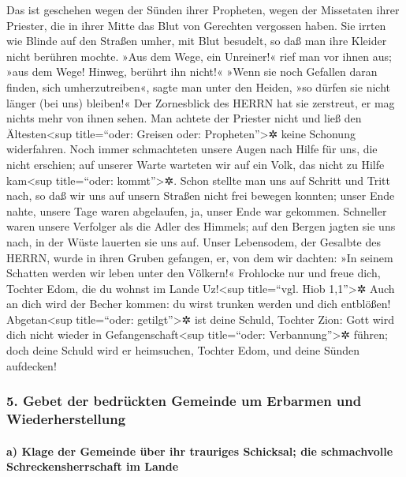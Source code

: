 Das ist geschehen wegen der Sünden ihrer Propheten, wegen
der Missetaten ihrer Priester, die in ihrer Mitte das Blut von Gerechten
vergossen haben. Sie irrten wie Blinde auf den Straßen
umher, mit Blut besudelt, so daß man ihre Kleider nicht berühren mochte.
»Aus dem Wege, ein Unreiner!« rief man vor ihnen aus;
»aus dem Wege! Hinweg, berührt ihn nicht!« »Wenn sie noch Gefallen daran
finden, sich umherzutreiben«, sagte man unter den Heiden, »so dürfen sie
nicht länger (bei uns) bleiben!« Der Zornesblick des
HERRN hat sie zerstreut, er mag nichts mehr von ihnen sehen. Man achtete
der Priester nicht und ließ den Ältesten\textless sup title=``oder:
Greisen oder: Propheten''\textgreater✲ keine Schonung widerfahren.
Noch immer schmachteten unsere Augen nach Hilfe für uns,
die nicht erschien; auf unserer Warte warteten wir auf ein Volk, das
nicht zu Hilfe kam\textless sup title=``oder: kommt''\textgreater✲.
Schon stellte man uns auf Schritt und Tritt nach, so daß
wir uns auf unsern Straßen nicht frei bewegen konnten; unser Ende nahte,
unsere Tage waren abgelaufen, ja, unser Ende war gekommen.
Schneller waren unsere Verfolger als die Adler des
Himmels; auf den Bergen jagten sie uns nach, in der Wüste lauerten sie
uns auf. Unser Lebensodem, der Gesalbte des HERRN, wurde
in ihren Gruben gefangen, er, von dem wir dachten: »In seinem Schatten
werden wir leben unter den Völkern!« Frohlocke nur und
freue dich, Tochter Edom, die du wohnst im Lande Uz!\textless sup
title=``vgl. Hiob 1,1''\textgreater✲ Auch an dich wird der Becher
kommen: du wirst trunken werden und dich entblößen!
Abgetan\textless sup title=``oder: getilgt''\textgreater✲
ist deine Schuld, Tochter Zion: Gott wird dich nicht wieder in
Gefangenschaft\textless sup title=``oder: Verbannung''\textgreater✲
führen; doch deine Schuld wird er heimsuchen, Tochter Edom, und deine
Sünden aufdecken!

\hypertarget{gebet-der-bedruxfcckten-gemeinde-um-erbarmen-und-wiederherstellung}{%
\subsubsection{5. Gebet der bedrückten Gemeinde um Erbarmen und
Wiederherstellung}\label{gebet-der-bedruxfcckten-gemeinde-um-erbarmen-und-wiederherstellung}}

\hypertarget{a-klage-der-gemeinde-uxfcber-ihr-trauriges-schicksal-die-schmachvolle-schreckensherrschaft-im-lande}{%
\paragraph{a) Klage der Gemeinde über ihr trauriges Schicksal; die
schmachvolle Schreckensherrschaft im
Lande}\label{a-klage-der-gemeinde-uxfcber-ihr-trauriges-schicksal-die-schmachvolle-schreckensherrschaft-im-lande}}

